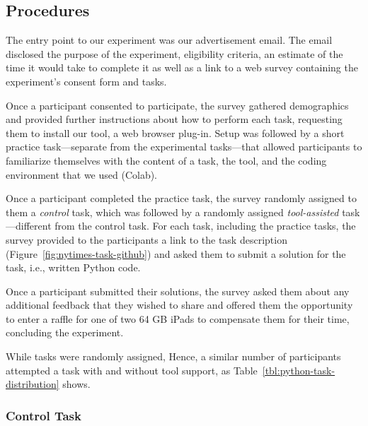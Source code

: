 \subsection{Procedures}
\label{cp6:procedures}




The entry point to our experiment was our advertisement email.
The email disclosed the purpose of the experiment, eligibility criteria, an estimate of the time it would take to complete it as well as a link 
to a web survey containing the experiment's consent form and tasks. 


Once a participant consented to participate, the survey gathered demographics and provided further instructions 
about how to perform each task, requesting them to install our tool, a web browser plug-in.
Setup was followed by a short practice task---separate from the experimental tasks---that allowed participants to familiarize themselves with the content of a task, the tool, and the coding environment that we used (Colab). 


Once a participant completed the practice task, the survey randomly assigned to them a \textit{control} task, which was followed by a randomly assigned \textit{tool-assisted} task---different from the control task.
For each task, including the practice tasks, the survey provided to the participants a link 
to the task description (Figure~\ref{fig:nytimes-task-github}) and asked them to submit a solution for the task, i.e., written Python code. 



Once a participant submitted their solutions, the survey
asked them about any additional feedback that they wished to share and 
offered them the opportunity to enter a raffle for one of two 64 GB  iPads 
to compensate them for their time, concluding the experiment.


While tasks were randomly assigned, 
Hence, a similar number of participants attempted a task with and without tool support, as Table~\ref{tbl:python-task-distribution} shows.








\subsubsection{Control Task}
\label{cp6:procedures-manual}

